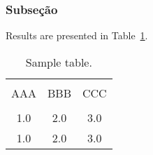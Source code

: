 \documentclass[jou,apacite]{apa6}
\begin{document}
\subsubsection{Subseção}



Results are presented in Table~\ref{tab1}.
\begin{table}[!htb]
\caption{Sample table.}\label{tab1}
\begin{tabular}{ccc}
\hline\\[-1.5ex]
AAA & BBB & CCC \\[0.5ex]
\hline\\[-1.5ex]
1.0 & 2.0 & 3.0\\[0.5ex]
1.0 & 2.0 & 3.0\\[0.5ex]
\hline
\end{tabular}
\end{table}



\end{document}
